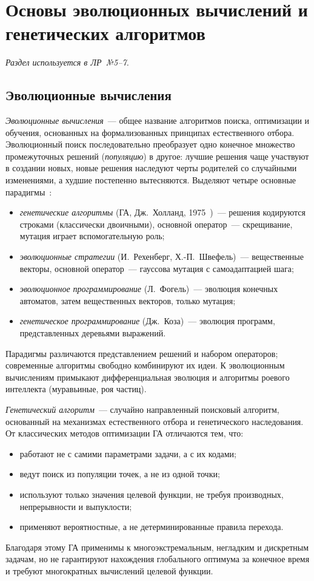 \section{Основы эволюционных вычислений и генетических алгоритмов}
\label{sec:ga}

\noindent\hspace{1.25cm}\emph{Раздел используется в ЛР~№5--7.}

\subsection{Эволюционные вычисления}

\emph{Эволюционные вычисления}~--- общее название алгоритмов поиска, оптимизации и обучения,
основанных на формализованных принципах естественного отбора. Эволюционный поиск последовательно
преобразует одно конечное множество промежуточных решений (\emph{популяцию}) в другое: лучшие решения
чаще участвуют в создании новых, новые решения наследуют черты родителей со случайными изменениями, а
худшие постепенно вытесняются. Выделяют четыре основные парадигмы~\cite{skobtsov2008, kureichik2006}:
\begin{itemize}
\item \emph{генетические алгоритмы} (ГА, Дж.~Холланд, 1975~\cite{holland1975})~--- решения кодируются
строками (классически двоичными), основной оператор~--- скрещивание, мутация играет вспомогательную роль;
\item \emph{эволюционные стратегии} (И.~Рехенберг, Х.-П.~Швефель)~--- вещественные векторы, основной
оператор~--- гауссова мутация с самоадаптацией шага;
\item \emph{эволюционное программирование} (Л.~Фогель)~--- эволюция конечных автоматов, затем
вещественных векторов, только мутация;
\item \emph{генетическое программирование} (Дж.~Коза)~--- эволюция программ, представленных деревьями
выражений.
\end{itemize}
Парадигмы различаются представлением решений и набором операторов; современные алгоритмы свободно
комбинируют их идеи. К эволюционным вычислениям примыкают дифференциальная эволюция и
алгоритмы роевого интеллекта (муравьиные, роя частиц).

\emph{Генетический алгоритм}~--- случайно направленный поисковый алгоритм, основанный на механизмах
естественного отбора и генетического наследования. От классических методов оптимизации ГА отличаются
тем, что:
\begin{itemize}
\item работают не с самими параметрами задачи, а с их кодами;
\item ведут поиск из популяции точек, а не из одной точки;
\item используют только значения целевой функции, не требуя производных, непрерывности и выпуклости;
\item применяют вероятностные, а не детерминированные правила перехода.
\end{itemize}
Благодаря этому ГА применимы к многоэкстремальным, негладким и дискретным задачам, но не гарантируют
нахождения глобального оптимума за конечное время и требуют многократных вычислений целевой функции.

